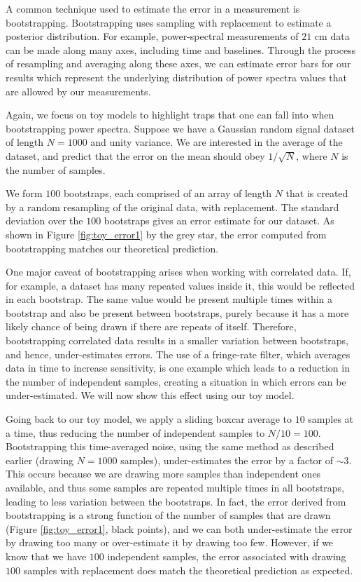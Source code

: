 \documentclass[preprint2,numberedappendix,tighten]{aastex6}  %
\begin{document}
A common technique used to estimate the error in a measurement is bootstrapping. Bootstrapping uses sampling with replacement to estimate a posterior distribution. For example, power-spectral measurements of $21$ cm data can be made along many axes, including time and baselines. Through the process of resampling and averaging along these axes, we can estimate error bars for our results which represent the underlying distribution of power spectra values that are allowed by our measurements.

Again, we focus on toy models to highlight traps that one can fall into when bootstrapping power spectra. Suppose we have a Gaussian random signal dataset of length $N=1000$ and unity variance. We are interested in the average of the dataset, and predict that the error on the mean should obey $1/\sqrt{N}$, where $N$ is the number of samples.

We form $100$ bootstraps, each comprised of an array of length $N$ that is created by a random resampling of the original data, with replacement. The standard deviation over the $100$ bootstraps gives an error estimate for our dataset. As shown in Figure \ref{fig:toy_error1} by the grey star, the error computed from bootstrapping matches our theoretical prediction.

One major caveat of bootstrapping arises when working with correlated data. If, for example, a dataset has many repeated values inside it, this would be reflected in each bootstrap. The same value would be present multiple times within a bootstrap and also be present between bootstraps, purely because it has a more likely chance of being drawn if there are repeats of itself. Therefore, bootstrapping correlated data results in a smaller variation between bootstraps, and hence, under-estimates errors. The use of a fringe-rate filter, which averages data in time to increase sensitivity, is one example which leads to a reduction in the number of independent samples, creating a situation in which errors can be under-estimated. We will now show this effect using our toy model.

Going back to our toy model, we apply a sliding boxcar average to $10$ samples at a time, thus reducing the number of independent samples to $N/10 = 100$. Bootstrapping this time-averaged noise, using the same method as described earlier (drawing $N=1000$ samples), under-estimates the error by a factor of $\sim3$. This occurs because we are drawing more samples than independent ones available, and thus some samples are repeated multiple times in all bootstraps, leading to less variation between the bootstraps. In fact, the error derived from bootstrapping is a strong function of the number of samples that are drawn (Figure \ref{fig:toy_error1}, black points), and we can both under-estimate the error by drawing too many or over-estimate it by drawing too few. However, if we know that we have $100$ independent samples, the error associated with drawing $100$ samples with replacement does match the theoretical prediction as expected.
\end{document}
